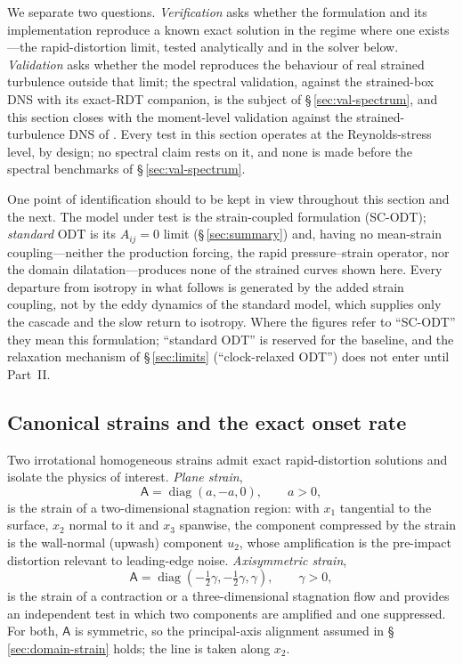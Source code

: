 \documentclass[lineno]{JFM-FLM_Au}
\begin{document}
We separate two questions. \emph{Verification} asks whether the
formulation and its implementation reproduce a known exact solution in
the regime where one exists---the rapid-distortion limit, tested
analytically and in the solver below. \emph{Validation} asks whether the
model reproduces the behaviour of real strained turbulence outside that
limit; the spectral validation, against the strained-box DNS with its
exact-RDT companion, is the subject of \S\,\ref{sec:val-spectrum}, and
this section closes with the moment-level validation against the
strained-turbulence DNS of \citet{LeeReynolds1985}. Every test in this
section operates at the Reynolds-stress level, by design; no spectral
claim rests on it, and none is made before the spectral benchmarks of
\S\,\ref{sec:val-spectrum}.

One point of identification should to be kept in view throughout this section
and the next. The model under test is the strain-coupled formulation
(SC-ODT); \emph{standard} ODT is its $A_{ij}=0$ limit
(\S\,\ref{sec:summary}) and, having no mean-strain coupling---neither
the production forcing, the rapid pressure--strain operator, nor the
domain dilatation---produces none of the strained curves shown here.
Every departure from isotropy in what follows is generated by the added
strain coupling, not by the eddy dynamics of the standard model, which
supplies only the cascade and the slow return to isotropy. Where the
figures refer to ``SC-ODT'' they mean this formulation; ``standard ODT''
is reserved for the baseline, and the relaxation mechanism of
\S\,\ref{sec:limits} (``clock-relaxed ODT'') does not enter until
Part~II.

\subsection{Canonical strains and the exact onset rate}\label{sec:onset}

Two irrotational homogeneous strains admit exact rapid-distortion
solutions and isolate the physics of interest. \emph{Plane strain},
\begin{equation}
  \mathsf{A}=\operatorname{diag}(a,-a,0),\qquad a>0,
  \label{eq:plane-strain}
\end{equation}
is the strain of a two-dimensional stagnation region: with $x_1$
tangential to the surface, $x_2$ normal to it and $x_3$ spanwise, the
component compressed by the strain is the wall-normal (upwash) component
$u_2$, whose amplification is the pre-impact distortion relevant to
leading-edge noise. \emph{Axisymmetric strain},
\begin{equation}
  \mathsf{A}=\operatorname{diag}(-\tfrac12\gamma,-\tfrac12\gamma,\gamma),
  \qquad \gamma>0,
  \label{eq:axi-strain}
\end{equation}
is the strain of a contraction or a three-dimensional stagnation flow and
provides an independent test in which two components are amplified and
one suppressed. For both, $\mathsf{A}$ is symmetric, so the
principal-axis alignment assumed in \S\,\ref{sec:domain-strain} holds;
the line is taken along $x_2$.
\end{document}
